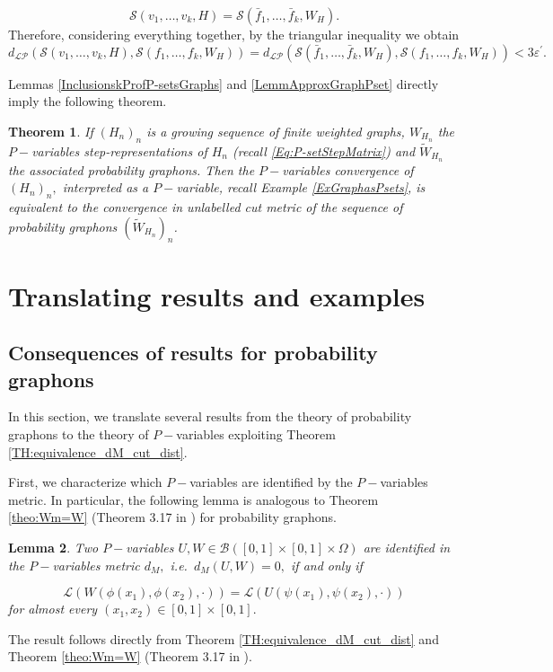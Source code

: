 \documentclass[11pt]{article}
\newtheorem{theorem}{Theorem}[section]
\newtheorem{lemma}[theorem]{Lemma}
\newcommand{\cB}{{\mathcal B}}  %
\newcommand{\cL}{{\mathcal L}}  %
\newcommand{\cS}{{\mathcal S}}  %
\begin{document}
$$\cS(v_1, \ldots, v_k,H)=\cS(\bar{f}_1, \ldots, \bar{f}_k,W_{H}).$$
Therefore, considering everything together, by the triangular inequality we obtain
$$
d_{\mathcal{LP}}(\cS(v_1, \ldots, v_k,H),\cS(f_1, \ldots, f_k,W_{H}))=d_{\mathcal{LP}}(\cS(\bar{f}_1, \ldots, \bar{f}_k,W_{H}),\cS(f_1, \ldots, f_k,W_{H}))<3\varepsilon^{\prime}.
$$

Lemmas \ref{InclusionskProfP-setsGraphs} and \ref{LemmApproxGraphPset}  directly imply the following theorem.

\begin{theorem} If $(H_n)_n$ is a growing sequence of finite weighted graphs, $W_{H_n}$ the $P-$variables step-representations of $H_n$ (recall \ref{Eq:P-setStepMatrix}) and $\widetilde W_{H_n}$ the associated probability graphons. Then the $P-$variables convergence of $(H_n)_n,$ interpreted as a $P-$variable, recall Example \ref{ExGraphasPsets}, is equivalent to the convergence in unlabelled cut metric of the sequence of probability graphons $(\widetilde W_{H_n})_n$. 
\end{theorem}

\section{Translating results and examples}\label{Sec5TranslatResultsExamp}

\subsection{Consequences of results for probability graphons}

In this section, we translate several results from the theory of probability graphons \cite{abraham2023probabilitygraphons,zucal2024probabilitygraphonsrightconvergence} to the theory of $P-$variables exploiting Theorem \ref{TH:equivalence_dM_cut_dist}.

First, we characterize which $P-$variables are identified by the $P-$variables metric. In particular, the following lemma is analogous to Theorem \ref{theo:Wm=W} (Theorem 3.17 in \cite{abraham2023probabilitygraphons}) for probability graphons.

\begin{lemma}
Two $P-$variables $U,W\in \cB([0,1]\times[0,1]\times \Omega)$ are identified in the $P-$variables metric $d_M,$ i.e.\ $d_M(U,W)=0,$ if and only if

$$
\cL(W(\phi(x_1),\phi(x_2),\cdot))=\cL(U(\psi(x_1),\psi(x_2),\cdot))
$$
for almost every $(x_1,x_2)\in [0,1]\times[0,1].$
\end{lemma}
\proof
The result follows directly from Theorem \ref{TH:equivalence_dM_cut_dist} and Theorem \ref{theo:Wm=W} (Theorem 3.17 in \cite{abraham2023probabilitygraphons}).
\endproof
\end{document}
